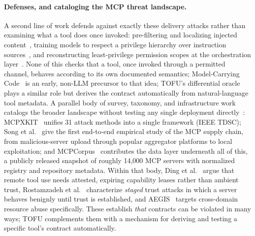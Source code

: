 \paragraph{Defenses, and cataloging the {MCP} threat landscape.}
A second line of work defends against exactly these delivery attacks rather than examining what a tool does once invoked: pre-filtering and localizing injected content~\cite{shi2025promptarmor,jia2026promptlocate}, training models to respect a privilege hierarchy over instruction sources~\cite{wallace2024instruction}, and reconstructing least-privilege permission scopes at the orchestration layer~\cite{zhu2025miniscope}. None of this checks that a tool, once invoked through a permitted channel, behaves according to its own documented semantics; Model-Carrying Code~\cite{sekar2003model} is an early, non-LLM precursor to that idea; TOFU's differential oracle plays a similar role but derives the contract automatically from natural-language tool metadata. A parallel body of survey, taxonomy, and infrastructure work catalogs the broader landscape without testing any single deployment directly~\cite{hou2025landscape,li2026towards,trustshiftprobe,aclemcp,web3survey}: MCPXKIT~\cite{guo2026systematic} unifies 31 attack methods into a single framework (IEEE TDSC); Song et al.~\cite{song2025beyond} give the first end-to-end empirical study of the MCP supply chain, from malicious-server upload through popular aggregator platforms to local exploitation; and MCPCorpus~\cite{lin2025mcpcorpus} contributes the data layer underneath all of this, a publicly released snapshot of roughly 14,000 MCP servers with normalized registry and repository metadata. Within that body, Ding et al.~\cite{aclemcp} argue that remote tool use needs attested, expiring capability leases rather than ambient trust, Rostamzadeh et al.~\cite{trustshiftprobe} characterize \emph{staged} trust attacks in which a server behaves benignly until trust is established, and AEGIS~\cite{aegis} targets cross-domain resource abuse specifically. These establish \emph{that} contracts can be violated in many ways; TOFU complements them with a mechanism for deriving and testing a specific tool's contract automatically.

